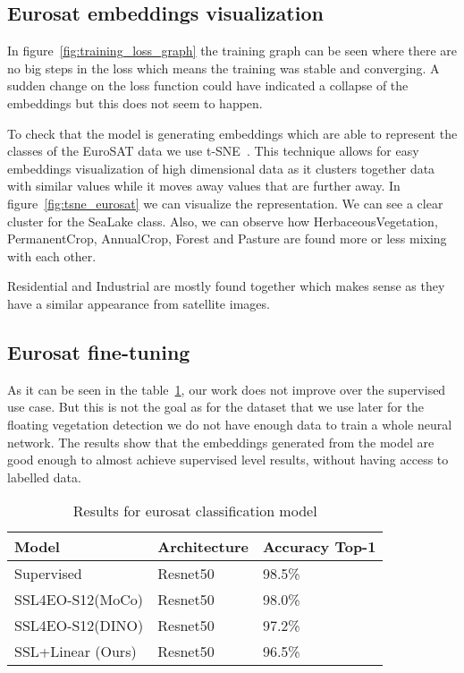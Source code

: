 \documentclass[conference]{IEEEtran}
\begin{document}
    \subsection{Eurosat embeddings visualization}

    In figure~\ref{fig:training_loss_graph} the training graph can be seen where there are no big steps in the loss which means the training was stable and converging.
    A sudden change on the loss function could have indicated a collapse of the embeddings but this does not seem to happen.

    To check that the model is generating embeddings which are able to represent the classes of the EuroSAT data we use t-SNE~\cite{JMLR:v9:vandermaaten08a}.
    This technique allows for easy embeddings visualization of high dimensional data as it clusters together data with similar values while it moves away
    values that are further away.
    In figure~\ref{fig:tsne_eurosat} we can visualize the representation.
    We can see a clear cluster for the SeaLake class.
    Also, we can observe how HerbaceousVegetation, PermanentCrop, AnnualCrop, Forest and Pasture are found more or less mixing with each other.

    Residential and Industrial are mostly found together which makes sense as they have a similar appearance from satellite images.

    \subsection{Eurosat fine-tuning}

    As it can be seen in the table~\ref{table:eurosat_results}, our work does not improve over the supervised use case.
    But this is not the goal as for the dataset that we use later for the floating vegetation detection we do not have enough
    data to train a whole neural network.
    The results show that the embeddings generated from the model are good enough to almost achieve supervised level results,
    without having access to labelled data.


    \begin{table}[h!]
        \centering
        \begin{tabular}{ |p{3cm}||p{2cm}|p{2cm}|}
            \hline
            Model                                    & Architecture & Accuracy Top-1 \\
            \hline
            \hline
            Supervised                               & Resnet50     & 98.5\%         \\
            SSL4EO-S12(MoCo)\cite{wang2023ssl4eos12} & Resnet50     & 98.0\%         \\
            SSL4EO-S12(DINO)\cite{wang2023ssl4eos12} & Resnet50     & 97.2\%         \\
            SSL+Linear (Ours)                        & Resnet50     & 96.5\%         \\
            \hline
        \end{tabular}
        \caption{Results for eurosat classification model}
        \label{table:eurosat_results}
    \end{table}
\end{document}
